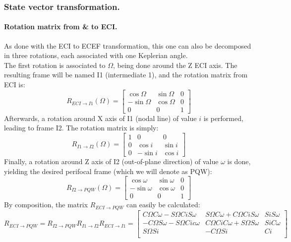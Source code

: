 		\subsubsection{State vector transformation.}
			\paragraph{Rotation matrix from \& to ECI. \\}
			\indent As done with the ECI to ECEF transformation, this one can also be decomposed in three rotations, each associated with one Keplerian angle.\\
			\indent The first rotation is associated to $\Omega$, being done around the Z ECI axis. The resulting frame will be named I1 (intermediate 1), and the rotation matrix from ECI is:
			\[
			R_{ECI\rightarrow I1}(\Omega) = \left[
			\begin{array}{lll}
			\cos \Omega 	& \sin \Omega 	& 0 \\
			- \sin \Omega 	& \cos \Omega 	& 0 \\
			0 				& 0 			& 1 
			\end{array}						
			\right]	
			\]
			\indent Afterwards, a rotation around X axis of I1 (nodal line) of value $i$ is performed, leading to frame I2. The rotation matrix is simply:
			\[
			R_{I1\rightarrow I2}(\Omega) = \left[
			\begin{array}{lll}
			1 	& 0			 	& 0 \\
			0 	& \cos i 		& \sin i \\
			0 	& -\sin i		& \cos i 
			\end{array}						
			\right]	
			\]
			\indent Finally, a rotation around Z axis of I2 (out-of-plane direction) of value $\omega$ is done, yielding the desired perifocal frame (which we will denote as PQW):
			\[
			R_{I2\rightarrow PQW}(\Omega) = \left[
			\begin{array}{lll}
			\cos \omega 	& \sin \omega 	& 0 \\
			- \sin \omega 	& \cos \omega 	& 0 \\
			0 				& 0 			& 1 
			\end{array}						
			\right]	
			\]
			\indent By composition, the matrix $R_{ECI\rightarrow PQW}$ can easily be calculated:
			\[
			R_{ECI \rightarrow PQW} = R_{I2 \rightarrow PQW}R_{I1 \rightarrow I2} R_{ECI \rightarrow I1} = 
			\left[\begin{array}{lll}
			C \Omega C \omega - S \Omega Ci S\omega 	& S\Omega C\omega + C\Omega Ci S\omega 	& Si S\omega \\
			-C \Omega S \omega - S \Omega Ci c\omega 	& C\Omega Ci C\omega + S\Omega S\omega 	& Si C\omega \\
			S \Omega Si									& - C\Omega Si  						& Ci \\
			\end{array}\right]
			\]
